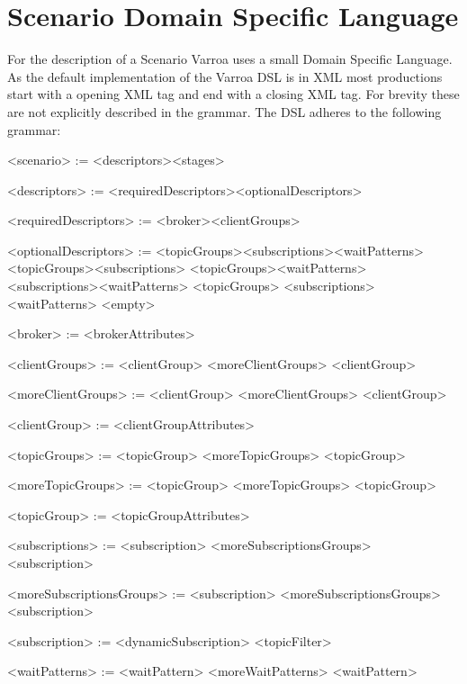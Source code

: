 \chapter{Scenario Domain Specific Language}\label{sec:ScenarioDomainSpecificLanguage}
\setlength{\grammarparsep}{14pt plus 1pt minus 1pt} %
\setlength{\grammarindent}{12em} %
For the description of a Scenario Varroa uses a small Domain Specific Language.
As the default implementation of the Varroa DSL is in XML most productions start with a opening XML tag and end with a closing XML tag. 
For brevity these are not explicitly described in the grammar. 
The DSL adheres to the following grammar:
\begin{grammar}
	<scenario> := 				<descriptors><stages>
	
	<descriptors> :=			<requiredDescriptors><optionalDescriptors>
	
	<requiredDescriptors> := 	<broker><clientGroups>
	
	<optionalDescriptors> := 	<topicGroups><subscriptions><waitPatterns>
								\alt <topicGroups><subscriptions>
								\alt <topicGroups><waitPatterns>
								\alt <subscriptions><waitPatterns>
								\alt <topicGroups>
								\alt <subscriptions>
								\alt <waitPatterns>
								\alt <empty>

	<broker> := <brokerAttributes>

	<clientGroups> := 	<clientGroup> <moreClientGroups>
						\alt <clientGroup>
						
	<moreClientGroups> := <clientGroup> <moreClientGroups>
							\alt <clientGroup>
	
	<clientGroup>  :=   <clientGroupAttributes>

	<topicGroups> := 	<topicGroup> <moreTopicGroups>
						\alt <topicGroup>
						
	<moreTopicGroups> := <topicGroup> <moreTopicGroups>
						\alt <topicGroup>
						
	<topicGroup>  :=    <topicGroupAttributes>

	<subscriptions> :=		<subscription> <moreSubscriptionsGroups>
							\alt <subscription>
	
	<moreSubscriptionsGroups> := 	<subscription> <moreSubscriptionsGroups>
							\alt <subscription>
	
	<subscription>  :=		<dynamicSubscription>
							\alt <topicFilter>

	<waitPatterns> := <waitPattern> <moreWaitPatterns>
						\alt <waitPattern>
						

\end{grammar}
